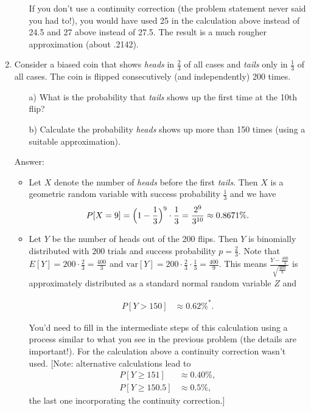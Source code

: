 \documentclass{article}
\begin{document}
\begin{enumerate}
\begin{itemize}
If you don't use a continuity correction (the problem statement never said you had to!), you would have used 25 in the calculation above instead of 24.5 and 27 above instead of 27.5. The result is a much rougher approximation (about .2142).
	
\end{itemize}


\newpage
\item
Consider a biased coin that shows {\em heads} in $\frac{2}{3}$ of all cases and {\em tails} only in $\frac{1}{3}$ of all cases. The coin is flipped consecutively (and independently) 200 times. 
\begin{itemize}
	\item[a)] What is the probability that {\em tails} shows up the first time at the 10th flip?
	\item[b)] Calculate the probability  {\em heads}  shows up more than 150 times (using a suitable approximation). 

\end{itemize}


Answer:

\begin{itemize}[a)]


\item Let $X$ denote the number of {\em heads} before the first {\em tails}. Then $X$ is a geometric random variable with success probability $\frac{1}{3}$ and we have
		\[ P[X=9] = \Bigl(1 - \frac{1}{3}\Bigr)^9 \cdot \frac{1}{3} = \frac{2^9}{3^{10}} \approx 0.8671\%.
		\]
		
		
\item Let $Y$ be the number of heads out of the 200 flips. Then $Y$ is binomially distributed with $200$ trials and success probability $p = \frac{2}{3}$. Note that $E[Y] = 200 \cdot \frac{2}{3} = \frac{400}{3}$ and $\text{var}[Y] = 200 \cdot \frac{2}{3} \cdot \frac{1}{3} = \frac{400}{9}$. This means $\frac{Y - \frac{400}{3}}{\sqrt{\frac{400}{9}}}$ is approximately distributed as a standard normal random variable $Z$ and 

		\begin{align*}
		P[Y> 150] &\approx 0.62\%^*.
		\end{align*}
		
You'd need to fill in the intermediate steps of this calculation using a process similar to what you see in the previous problem (the details are important!). For the calculation above a continuity correction wasn't used.
		[Note: alternative calculations lead to
		\begin{align*}
		P[Y \geq 151] &  \approx 0.40\%,\\
		P[Y \geq 150.5] &  \approx  0.5\%,
		\end{align*}
		the last one incorporating the continuity correction.]


\end{itemize}
\end{enumerate}
\end{document}
